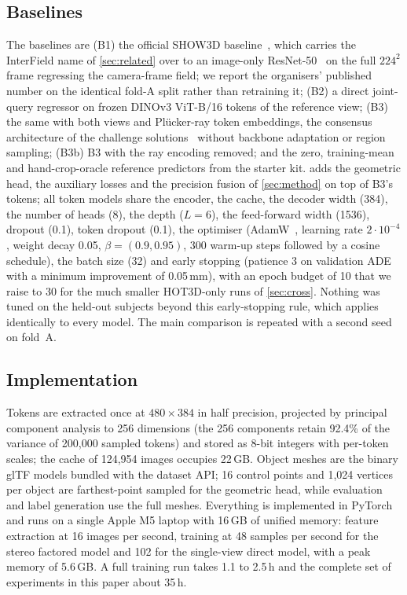 \subsection{Baselines}
The baselines are (B1) the official SHOW3D baseline~\cite{rim2026show3dapi}, which carries the InterField name of \cref{sec:related} over to an image-only ResNet-50~\cite{he2016resnet} on the full $224^2$ frame regressing the camera-frame field; we report the organisers' published number on the identical fold-A split rather than retraining it; (B2) a direct joint-query regressor on frozen DINOv3 ViT-B/16 tokens of the reference view; (B3) the same with both views and Pl\"ucker-ray token embeddings, \ie{} the consensus architecture of the challenge solutions~\cite{zou2026golf,jin2026jssr} without backbone adaptation or region sampling; (B3b) B3 with the ray encoding removed; and the zero, training-mean and hand-crop-oracle reference predictors from the starter kit. \method{} adds the geometric head, the auxiliary losses and the precision fusion of \cref{sec:method} on top of B3's tokens; all token models share the encoder, the cache, the decoder width (384), the number of heads (8), the depth ($L{=}6$), the feed-forward width (1536), dropout (0.1), token dropout (0.1), the optimiser (AdamW~\cite{loshchilov2019adamw}, learning rate $2\cdot10^{-4}$, weight decay 0.05, $\beta=(0.9,0.95)$, 300 warm-up steps followed by a cosine schedule), the batch size (32) and early stopping (patience 3 on validation ADE with a minimum improvement of 0.05\,mm), with an epoch budget of 10 that we raise to 30 for the much smaller HOT3D-only runs of \cref{sec:cross}. Nothing was tuned on the held-out subjects beyond this early-stopping rule, which applies identically to every model. The main comparison is repeated with a second seed on fold~A.

\subsection{Implementation}
Tokens are extracted once at $480\times384$ in half precision, projected by principal component analysis to 256 dimensions (the 256 components retain 92.4\% of the variance of 200,000 sampled tokens) and stored as 8-bit integers with per-token scales; the cache of 124,954 images occupies 22\,GB. Object meshes are the binary glTF models bundled with the dataset API; 16 control points and 1,024 vertices per object are farthest-point sampled for the geometric head, while evaluation and label generation use the full meshes. Everything is implemented in PyTorch~\cite{paszke2019pytorch} and runs on a single Apple M5 laptop with 16\,GB of unified memory: feature extraction at 16 images per second, training at 48 samples per second for the stereo factored model and 102 for the single-view direct model, with a peak memory of 5.6\,GB. A full training run takes 1.1 to 2.5\,h and the complete set of experiments in this paper about 35\,h.
